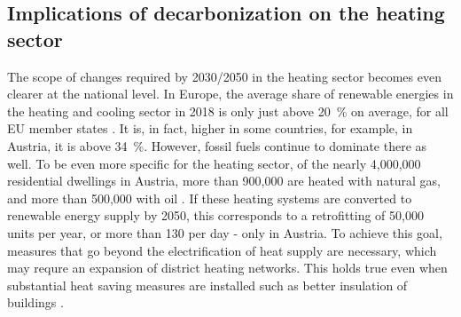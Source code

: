 \subsection{Implications of decarbonization on the heating sector}
The scope of changes required by 2030/2050 in the heating sector becomes even clearer at the national level. In Europe, the average share of renewable energies in the heating and cooling sector in 2018 is only just above \SI{20}{\%} on average, for all EU member states \cite{eurostat_reference}. It is, in fact, higher in some countries, for example, in Austria, it is above \SI{34}{\%}. However, fossil fuels continue to dominate there as well. To be even more specific for the heating sector, of the nearly 4,000,000 residential dwellings in Austria, more than 900,000 are heated with natural gas, and more than 500,000 with oil \cite{statistik_austria}. If these heating systems are converted to renewable energy supply by 2050, this corresponds to a retrofitting of 50,000 units per year, or more than 130 per day - only in Austria. To achieve this goal, measures that go beyond the electrification of heat supply are necessary, which may requre an expansion of district heating networks. This holds true even when substantial heat saving measures are installed such as better insulation of buildings \cite{jalil2018spatially}.\vspace{0.3cm}

